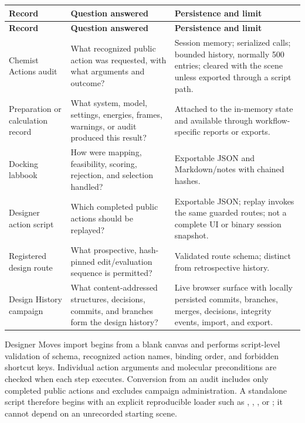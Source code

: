 \documentclass[11pt]{article}
\begin{document}
\begingroup
\footnotesize
\begin{longtable}{@{}p{1.23in}p{2.76in}p{2.61in}@{}}
\toprule
\textbf{Record} & \textbf{Question answered} & \textbf{Persistence and limit}\\
\midrule
\endfirsthead
\toprule
\textbf{Record} & \textbf{Question answered} & \textbf{Persistence and limit}\\
\midrule
\endhead
Chemist Actions audit & What recognized public action was requested, with what arguments and outcome? & Session memory; serialized calls; bounded history, normally 500 entries; cleared with the scene unless exported through a script path.\\
Preparation or calculation record & What system, model, settings, energies, frames, warnings, or audit produced this result? & Attached to the in-memory state and available through workflow-specific reports or exports.\\
Docking labbook & How were mapping, feasibility, scoring, rejection, and selection handled? & Exportable JSON and Markdown/notes with chained hashes.\\
Designer action script & Which completed public actions should be replayed? & Exportable JSON; replay invokes the same guarded routes; not a complete UI or binary session snapshot.\\
Registered design route & What prospective, hash-pinned edit/evaluation sequence is permitted? & Validated route schema; distinct from retrospective history.\\
Design History campaign & What content-addressed structures, decisions, commits, and branches form the design history? & Live browser surface with locally persisted commits, branches, merges, decisions, integrity events, import, and export.\\
\bottomrule
\end{longtable}
\endgroup


Designer Moves import begins from a blank canvas and performs script-level validation of schema, recognized action names, binding order, and forbidden shortcut keys. Individual action arguments and molecular preconditions are checked when each step executes. Conversion from an audit includes only completed public actions and excludes campaign administration. A standalone script therefore begins with an explicit reproducible loader such as , , , or ; it cannot depend on an unrecorded starting scene.
\end{document}

